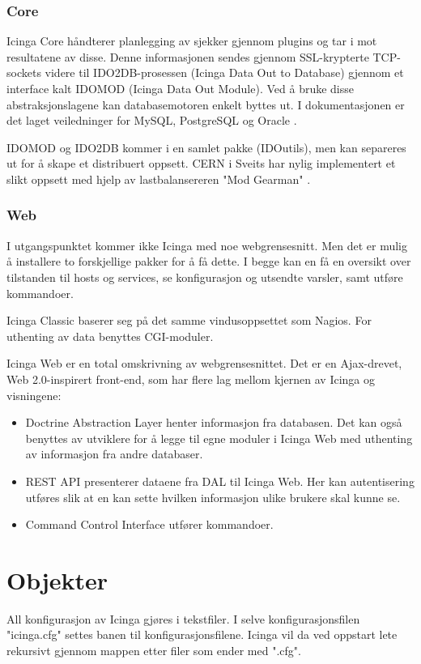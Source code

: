 \subsubsection{Core}
Icinga Core håndterer planlegging av sjekker gjennom plugins og tar i mot resultatene av disse. Denne informasjonen sendes gjennom SSL-krypterte TCP-sockets videre til IDO2DB-prosessen (Icinga Data Out to Database) gjennom et interface kalt IDOMOD (Icinga Data Out Module). Ved å bruke disse abstraksjonslagene kan databasemotoren enkelt byttes ut. I dokumentasjonen er det laget veiledninger for MySQL, PostgreSQL og Oracle \cite{icingaarchitecture}.

IDOMOD og IDO2DB kommer i en samlet pakke (IDOutils), men kan separeres ut for å skape et distribuert oppsett. CERN i Sveits har nylig implementert et slikt oppsett med hjelp av lastbalansereren "Mod Gearman" \cite{cernthesis}.

\subsubsection{Web}\label{sec:teoriweb}
I utgangspunktet kommer ikke Icinga med noe webgrensesnitt. Men det er mulig å installere to forskjellige pakker for å få dette. I begge kan en få en oversikt over tilstanden til hosts og services, se konfigurasjon og utsendte varsler, samt utføre kommandoer.

Icinga Classic baserer seg på det samme vindusoppsettet som Nagios. For uthenting av data benyttes CGI-moduler.

Icinga Web er en total omskrivning av webgrensesnittet. Det er en Ajax-drevet, Web 2.0-inspirert front-end, som har flere lag mellom kjernen av Icinga og visningene:

\begin{itemize}
	\item Doctrine Abstraction Layer henter informasjon fra databasen. Det kan også benyttes av utviklere for å legge til egne moduler i Icinga Web med uthenting av informasjon fra andre databaser.
	\item REST API presenterer dataene fra DAL til Icinga Web. Her kan autentisering utføres slik at en kan sette hvilken informasjon ulike brukere skal kunne se.
	\item Command Control Interface utfører kommandoer.
\end{itemize}

\section{Objekter}\label{sec:objekter}
All konfigurasjon av Icinga gjøres i tekstfiler. I selve konfigurasjonsfilen "icinga.cfg" settes banen til konfigurasjonsfilene. Icinga vil da ved oppstart lete rekursivt gjennom mappen etter filer som ender med ".cfg".

